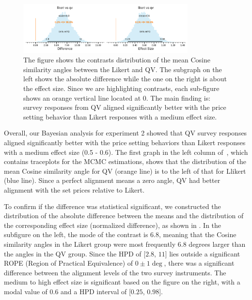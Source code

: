 \begin{figure}[htpb]
  \centering
  \includegraphics[trim= 0in 0in 0in 0in, clip, width=0.8\textwidth, keepaspectratio=true]{"content/image/Votes_Prices_StudentT_differences_and_effects.pdf"}
  \caption{
    The figure shows the contrasts distribution of the mean Cosine similarity angles between the Likert and QV. The subgraph on the left shows the absolute difference while the one on the right is about the effect size. Since we are highlighting contrasts, each sub-figure shows an orange vertical line located at 0. The main finding is: survey responses from QV aligned significantly better with the price setting behavior than Likert responses with a medium effect size.
  }
  \label{fig:contrast_exp2}
\end{figure}

Overall, our Bayesian analysis for experiment 2 showed that QV survey responses aligned significantly better with the price setting behaviors than Likert responses with a medium effect size (0.5 - 0.6). The first graph in the left column of~, which contains traceplots for the MCMC estimations, shows that the distribution of the mean Cosine similarity angle for QV (orange line) is to the left of that for Llikert (blue line). Since a perfect alignment means a zero angle, QV had better alignment with the set prices relative to Likert. 

To confirm if the difference was statistical significant, we constructed the distribution of the absolute difference between the means and the distribution of the corresponding effect size (normalized difference), as shown in . In the subfigure on the left, the mode of the contrast is $6.8$, meaning that the Cosine similarity angles in the Likert group were most frequently $6.8$ degrees larger than the angles in the QV group. Since the HPD of [$2.8$, $11$] lies outside a significant ROPE (Region of Practical Equivalence) of $0 \pm 1 \deg$, there was a significant difference between the alignment levels of the two survey instruments. The medium to high effect size is significant based on the figure on the right, with a modal value of $0.6$ and a HPD interval of [$0.25$, $0.98$].


